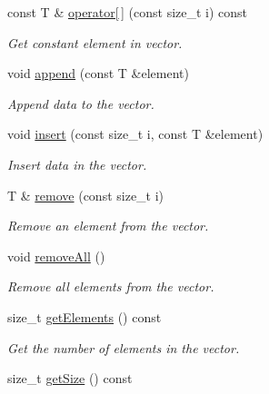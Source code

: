 \begin{DoxyCompactItemize}
const T \& \hyperlink{classPandora_1_1Utils_1_1Vector_a9841fe5df9567810a8be69891e5bf5cf}{operator\mbox{[}$\,$\mbox{]}} (const size\_\-t i) const 
\begin{DoxyCompactList}\small\item\em Get constant element in vector. \item\end{DoxyCompactList}\item 
void \hyperlink{classPandora_1_1Utils_1_1Vector_a6c1c963c1d58b1e371a07c048c33cdca}{append} (const T \&element)
\begin{DoxyCompactList}\small\item\em Append data to the vector. \item\end{DoxyCompactList}\item 
void \hyperlink{classPandora_1_1Utils_1_1Vector_a8757e06ea29132d0b8873a13b6c1d956}{insert} (const size\_\-t i, const T \&element)
\begin{DoxyCompactList}\small\item\em Insert data in the vector. \item\end{DoxyCompactList}\item 
T \& \hyperlink{classPandora_1_1Utils_1_1Vector_a321442d5b814dd8709319ad109af1700}{remove} (const size\_\-t i)
\begin{DoxyCompactList}\small\item\em Remove an element from the vector. \item\end{DoxyCompactList}\item 
void \hyperlink{classPandora_1_1Utils_1_1Vector_ab9f631b7ca468cba7f358ee14043b0a6}{removeAll} ()
\begin{DoxyCompactList}\small\item\em Remove all elements from the vector. \item\end{DoxyCompactList}\item 
size\_\-t \hyperlink{classPandora_1_1Utils_1_1Vector_a4d21fd9aff673df56471a9724b36fe2c}{getElements} () const 
\begin{DoxyCompactList}\small\item\em Get the number of elements in the vector. \item\end{DoxyCompactList}\item 
size\_\-t \hyperlink{classPandora_1_1Utils_1_1Vector_a8df1cb3c4cc21dca4b093eed28c62b9a}{getSize} () const 

\end{DoxyCompactItemize}

